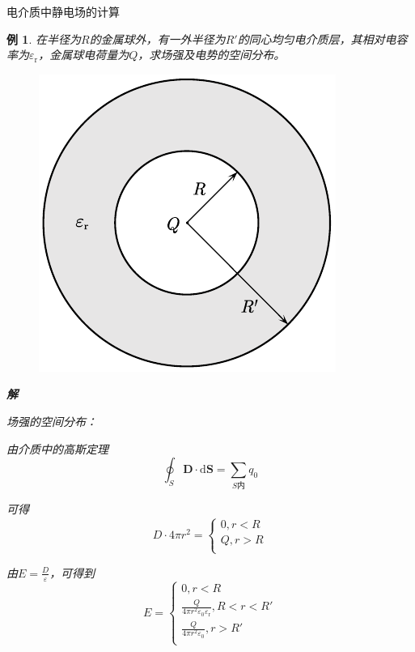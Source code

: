 \documentclass[12pt, a4paper, twoside]{ctexbook}
\newtheorem{example}[theorem]{例}
\begin{document}
{\sonti 电介质中静电场的计算}
\begin{example}
    在半径为$R$的金属球外，有一外半径为$R'$的同心均匀电介质层，其相对电容率为$\varepsilon_{\mathrm{r}}$，金属球电荷量为$Q$，求场强及电势的空间分布。
    \begin{figure}[H]
        \centerline{\includegraphics[scale=1.0]{CH09EX06.pdf}}
    \end{figure}
    \noindent\textbf{解}

    {\sonti 场强的空间分布}：
    
    由介质中的高斯定理
    $$
    \oint_S \boldsymbol{D}\cdot\mathrm{d}\boldsymbol{S}=\sum_{S\text{内}}q_0
    $$
    
    可得
    $$
    D\cdot 4\pi r^2=\left\{ \begin{array}{l}
        0,r<R\\
        Q,r>R\\
    \end{array} \right. 
    $$
    
    由$E=\frac{D}{\varepsilon}$，可得到
    $$
    E=\left\{ \begin{array}{l}
        0,r<R\\
        \frac{Q}{4\pi r^2\varepsilon _0\varepsilon _{\text{r}}},R<r<R'\\
        \frac{Q}{4\pi r^2\varepsilon _0},r>R'\\
    \end{array} \right. 
    $$
    

\end{example}
\end{document}
